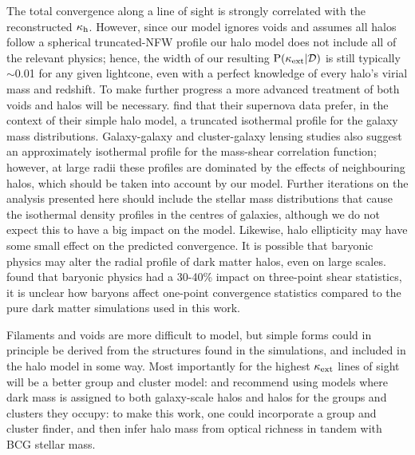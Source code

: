 \documentclass[useAMS,usenatbib]{mn2e}
\begin{document}
The total convergence along a line of sight is strongly correlated with the
reconstructed $\kappa_{\rm h}$. However, since our model ignores voids and assumes
all halos follow a spherical truncated-NFW profile our halo model does not
include all of the relevant physics; hence, the width of our resulting
${\rm P}(\kappa_{\rm ext}|{\mathcal{D}})$ is still typically $\sim$0.01 for any given lightcone,
even with a perfect knowledge of every halo's virial mass and redshift. To
make further progress a more advanced treatment of both voids and halos will
be necessary. \citet{KarpenkaEtal2012} find that their supernova data prefer,
in the context of their simple halo model, a truncated isothermal profile for
the galaxy mass distributions. Galaxy-galaxy and cluster-galaxy  lensing
studies \citep[\eg][]{GavazziEtal2007,JohnstonEtal2007} also suggest an
approximately isothermal profile for the mass-shear correlation function;
however, at large radii these profiles are dominated by the effects of
neighbouring halos, which should be taken into account by our model. Further
iterations on the analysis presented here should include the stellar mass
distributions that cause the isothermal density profiles in the centres of
galaxies, although we do not expect this to have a big impact on the model.
Likewise,  halo ellipticity may have some small effect on the predicted
convergence. It is possible that baryonic physics may alter   
the radial profile of dark matter halos, even on large scales. \citet{Semboloni+2012}
found that baryonic physics had a 30-40\% impact on three-point shear statistics, it is
unclear how baryons affect one-point convergence statistics compared to the pure dark matter
simulations used in this work.

Filaments and voids are more difficult to model, but simple forms could in
principle be derived from the structures found in the simulations, and
included in the halo model in some way. Most importantly for the highest
$\kappa_{\rm ext}$ lines of sight will be a better group and cluster model:
\citet{MomchevaEtal2006} and  \citet{WongEtal2011} recommend using models
where dark mass is assigned to both galaxy-scale halos and halos for the
groups and clusters they occupy: to make this work, one could incorporate a
group and cluster finder, and then infer halo mass from optical richness
\citep[\eg][]{MaxBCG} in tandem with BCG stellar mass.
\end{document}
